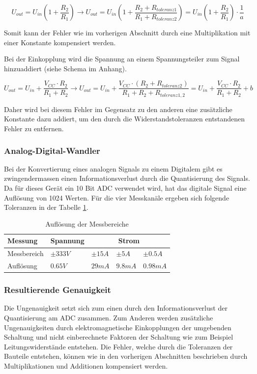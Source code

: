 \begin{equation}
U_{out} = U_{in} \left( 1+\frac{R_2}{R_1} \right) \to U_{out} = U_{in} \left( 1+\frac{R_2+R_{toleranz1}}{R_1+R_{toleranz2}} \right) = U_{in}\left(1+\frac{R_2}{R_1}\right) \cdot \frac{1}{a}
\end{equation}

Somit kann der Fehler wie im vorherigen Abschnitt durch eine Multiplikation mit einer Konstante kompensiert werden.

Bei der Einkopplung wird die Spannung an einem Spannungsteiler zum Signal hinzuaddiert (siehe Schema im Anhang).

\begin{equation}
U_{out} = U_{in} + \frac{V_{CC} \cdot R_2}{R_1+R_2} \to U_{out} = U_{in} + \frac{V_{CC} \cdot (R_2 + R_{toleranz2})}{R_1+R_2 + R_{toleranz1,2}} =  U_{in} + \frac{V_{CC} \cdot R_2}{R_1+R_2} + b
\end{equation}

Daher wird bei diesem Fehler im Gegensatz zu den anderen eine zusätzliche Konstante dazu addiert, um den durch die Widerstandstoleranzen entstandenen Fehler zu entfernen.
 
\subsubsection*{Analog-Digital-Wandler}
Bei der Konvertierung eines analogen Signals zu einem Digitalem gibt es zwingendermassen einen Informationsverlust durch die Quantisierung des Signals. Da für dieses Gerät ein 10 Bit ADC verwendet wird, hat das digitale Signal eine Auflösung von 1024 Werten. Für die vier Messkanäle ergeben sich folgende Toleranzen in der Tabelle \ref{tab:auflösung}.


\begin{table}[H]
\centering
\begin{tabular}{|l|l|l|l|l|}
\hline
Messung     & Spannung  & \multicolumn{3}{c|}{Strom}     \\ \hline
Messbereich & $\pm333V$ & $\pm15A$ & $\pm5A$ & $\pm0.5A$ \\ \hline
Auflösung   & $0.65V$   & $29mA$   & $9.8mA$ & $0.98mA$  \\ \hline
\end{tabular}
\caption{Auflösung der Messbereiche}
\label{tab:auflösung}
\end{table}

\subsubsection*{Resultierende Genauigkeit} 
Die Ungenauigkeit setzt sich zum einen durch den Informationsverlust der Quantisierung am ADC zusammen. Zum Anderen werden zusätzliche Ungenauigkeiten durch elektromagnetische Einkopplungen der umgebenden Schaltung und nicht einberechnete Faktoren der Schaltung wie zum Beispiel Leitungswiderstände entstehen. Die Fehler, welche durch die Toleranzen der Bauteile entstehen, können wie in den vorherigen Abschnitten beschrieben durch Multiplikationen und Additionen kompensiert werden.



\pagebreak